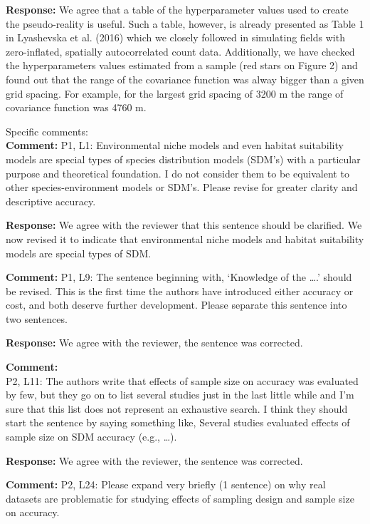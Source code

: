 \documentclass{letter}
\begin{document}
\begin{letter}
\textbf{Response:}
We agree that a table of the hyperparameter values used to create the pseudo-reality is useful. Such a table, however, is already presented as Table 1 in Lyashevska et al. (2016) which we closely followed in simulating fields with zero-inflated, spatially autocorrelated count data. Additionally, we have checked the hyperparameters values estimated from a sample (red stars on Figure 2) and found out that the range of the covariance function was alway bigger than a given grid spacing. For example, for the largest grid spacing of 3200 m the range of covariance function was 4760 m. 

Specific comments:\\

\textbf{Comment:} 
P1, L1: Environmental niche models and even habitat suitability models are special types of species distribution models (SDM's) with a particular purpose and theoretical foundation. I do not consider them to be equivalent to other species-environment models or SDM's. Please revise for greater clarity and descriptive accuracy. 

\textbf{Response:}
We agree with the reviewer that this sentence should be clarified. We now revised it to indicate that environmental niche models and habitat suitability models are special types of SDM.

\textbf{Comment:} 
P1, L9: The sentence beginning with, `Knowledge of the ….' should be revised. This is the first time the authors have introduced either accuracy or cost, and both deserve further development. Please separate this sentence into two sentences. 

\textbf{Response:}
We agree with the reviewer, the sentence was corrected.

\textbf{Comment:} \\
P2, L11: The authors write that effects of sample size on accuracy was evaluated by few, but they go on to list several studies just in the last little while and I'm sure that this list does not represent an exhaustive search. I think they should start the sentence by saying something like, Several studies evaluated effects of sample size on SDM accuracy (e.g., …). 

\textbf{Response:}
We agree with the reviewer, the sentence was corrected.

\textbf{Comment:} 
P2, L24: Please expand very briefly (1 sentence) on why real datasets are problematic for studying effects of sampling design and sample size on accuracy. 


\end{letter}
\end{document}
